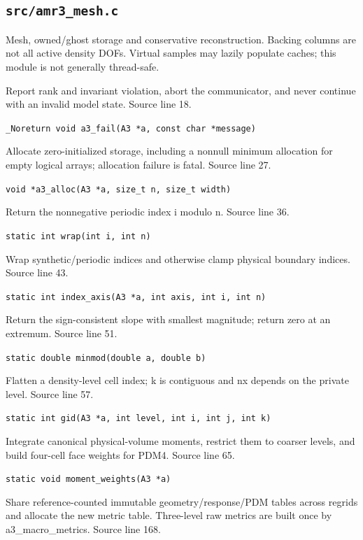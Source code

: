 \subsection{\texttt{src/amr3\_mesh.c}}
Mesh, owned/ghost storage and conservative reconstruction. Backing columns are not all active density DOFs. Virtual samples may lazily populate caches; this module is not generally thread-safe.
\begin{description}[style=nextline,leftmargin=0pt,labelindent=0pt,labelwidth=0pt,labelsep=0pt]
\item[\texttt{a3\_fail}] Report rank and invariant violation, abort the communicator, and never continue with an invalid model state. Source line 18.\par
{\small\nolinkurl{_Noreturn void a3_fail(A3 *a, const char *message)}}
\item[\texttt{a3\_alloc}] Allocate zero-initialized storage, including a nonnull minimum allocation for empty logical arrays; allocation failure is fatal. Source line 27.\par
{\small\nolinkurl{void *a3_alloc(A3 *a, size_t n, size_t width)}}
\item[\texttt{wrap}] Return the nonnegative periodic index i modulo n. Source line 36.\par
{\small\nolinkurl{static int wrap(int i, int n)}}
\item[\texttt{index\_axis}] Wrap synthetic/periodic indices and otherwise clamp physical boundary indices. Source line 43.\par
{\small\nolinkurl{static int index_axis(A3 *a, int axis, int i, int n)}}
\item[\texttt{minmod}] Return the sign-consistent slope with smallest magnitude; return zero at an extremum. Source line 51.\par
{\small\nolinkurl{static double minmod(double a, double b)}}
\item[\texttt{gid}] Flatten a density-level cell index; k is contiguous and nx depends on the private level. Source line 57.\par
{\small\nolinkurl{static int gid(A3 *a, int level, int i, int j, int k)}}
\item[\texttt{moment\_weights}] Integrate canonical physical-volume moments, restrict them to coarser levels, and build four-cell face weights for PDM4. Source line 65.\par
{\small\nolinkurl{static void moment_weights(A3 *a)}}
\item[\texttt{geometry\_cache}] Share reference-counted immutable geometry/response/PDM tables across regrids and allocate the new metric table. Three-level raw metrics are built once by a3\_macro\_metrics. Source line 168.\par

\end{description}
